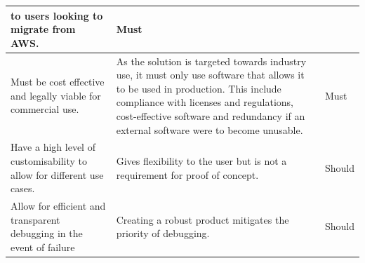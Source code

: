\documentclass[12pt, conference, final, a4paper, onecolumn, compsoc]{IEEEtran}
\begin{document}
\begin{table}[H]
\begin{tabular}{|p{}|p{}|l|}
                                                   to users looking to migrate
                                                   from AWS. & Must \\ \hline
    Must be cost effective and legally viable for commercial use. & As the
                                                                    solution is
                                                                    targeted
                                                                    towards
                                                                    industry
                                                                    use, it must
                                                                    only use
                                                                    software
                                                                    that
                                                                    allows it to
                                                                    be used in
                                                                    production.
                                                                    This include
                                                                    compliance
                                                                    with
                                                                    licenses and
                                                                    regulations,
                                                                    cost-effective
                                                                    software and
                                                                    redundancy
                                                                    if an
                                                                    external
                                                                    software
                                                                    were to
                                                                    become
                                                                    unusable. &
                                                                                Must
                                                                                \\ \hline
    \hline

    Have a high level of customisability to allow for different use cases. &
                                                                            Gives flexibility to the user but is not a requirement for proof of concept. &
                                                                                                                                                          Should \\ \hline Allow for efficient and transparent debugging in the event of
    failure & Creating a robust product mitigates the priority of debugging. &
                                                                               Should \\ \hline


\end{tabular}
\end{table}
\end{document}
